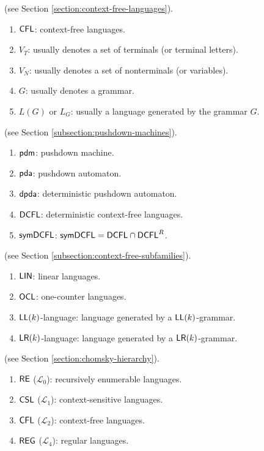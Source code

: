  (see Section \ref{section:context-free-languages}).

\begin{enumerate}[]
\item $\textup{\sf CFL}$: context-free languages.
\item $V_T$: usually denotes a set of terminals (or terminal letters).
\item $V_N$: usually denotes a set of nonterminals (or variables).
\item $G$: usually denotes a grammar.
\item $L(G)$ or $L_G$: usually a language generated by the grammar $G$.
\end{enumerate}

 (see Section \ref{subsection:pushdown-machines}).

\begin{enumerate}[]
\item $\textup{\sf pdm}$: pushdown machine.
\item $\textup{\sf pda}$: pushdown automaton.
\item $\textup{\sf dpda}$: deterministic pushdown automaton.
\item $\textup{\sf DCFL}$: deterministic context-free languages.
\item $\textup{\sf symDCFL}$: $\textup{\sf symDCFL} = \textup{\sf DCFL}\cap\textup{\sf DCFL}^R$.
\end{enumerate}


 (see Section \ref{subsection:context-free-subfamilies}).

\begin{enumerate}[]
\item $\textup{\sf LIN}$: linear languages.
\item $\textup{\sf OCL}$: one-counter languages.
\item $\textup{\sf LL}(k)$-language: language generated by a $\textup{\sf LL}(k)$-grammar.
\item $\textup{\sf LR}(k)$-language: language generated by a $\textup{\sf LR}(k)$-grammar.
\end{enumerate}

 (see Section \ref{section:chomsky-hierarchy}).

\begin{enumerate}[]
\item $\textup{\sf RE}$ ($\mathcal{L}_0$): recursively enumerable languages.
\item $\textup{\sf CSL}$ ($\mathcal{L}_1$): context-sensitive languages.
\item $\textup{\sf CFL}$ ($\mathcal{L}_2$): context-free languages.
\item $\textup{\sf REG}$ ($\mathcal{L}_4$): regular languages.
\end{enumerate}

